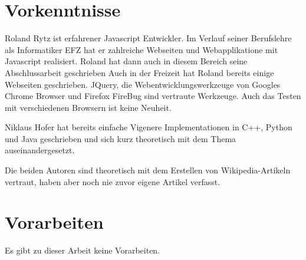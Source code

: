 \documentclass[11pt,paper=a4,final]{scrartcl}
\begin{document}
\section{Vorkenntnisse}
Roland Rytz ist erfahrener Javascript Entwickler. Im Verlauf seiner Berufslehre
als Informatiker EFZ hat er zahlreiche Webseiten und Webapplikatione mit
Javascript realisiert. Roland hat dann auch in diesem Bereich seine
Abschlussarbeit geschrieben Auch in der Freizeit hat Roland bereits einige
Webseiten geschrieben. JQuery, die Webentwicklungswerkzeuge von Googles Chrome
Browser und Firefox FireBug sind vertraute Werkzeuge. Auch das Testen mit
verschiedenen Browsern ist keine Neuheit.

Niklaus Hofer hat bereits einfache Vigenere Implementationen in C++, Python und
Java geschrieben und sich kurz theoretisch mit dem Thema auseinandergesetzt.

Die beiden Autoren sind theoretisch mit dem Erstellen von Wikipedia-Artikeln
vertraut, haben aber noch nie zuvor eigene Artikel verfasst.
\section{Vorarbeiten}
Es gibt zu dieser Arbeit keine Vorarbeiten.
\end{document}
